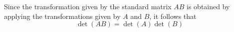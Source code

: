 \begin{applicationActivities}{1}{25}
\begin{activity}{5}
\end{activity}

\begin{fact}
Since the transformation given by the standard matrix \(AB\) is obtained
by applying the transformations given by \(A\) and \(B\), it follows that \[\det(AB)=\det(A)\det(B)\]
%
%
\end{fact}


\end{applicationActivities}
